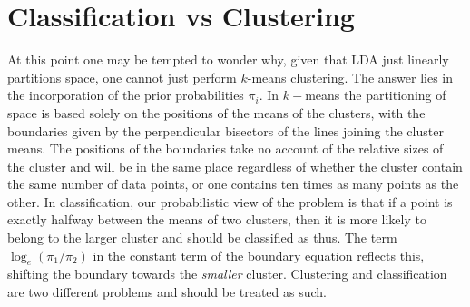 \documentclass[12pt,a4paper]{tufte-handout}
\begin{document}
\section{Classification vs Clustering}
At this point one may be tempted to wonder why, given that LDA just linearly partitions space, one cannot just perform $k$-means clustering. The answer lies in the incorporation of the prior probabilities $\pi_i$. In $k-$means the partitioning of space is based solely on the positions of the means of the clusters, with the boundaries given by the perpendicular bisectors of the lines joining the cluster means. The positions of the boundaries take no account of the relative sizes of the cluster and will be in the same place regardless of whether the cluster contain the same number of data points, or one contains ten times as many points as the other. In classification, our probabilistic view of the problem is that if a point is exactly halfway between the means of two clusters, then it is more likely to belong to the larger cluster and should be classified as thus. The term $\log_e(\pi_1/\pi_2)$ in the constant term of the boundary equation reflects this, shifting the boundary towards the \textit{smaller} cluster. Clustering and classification are two different problems and should be treated as such.



\end{document}
